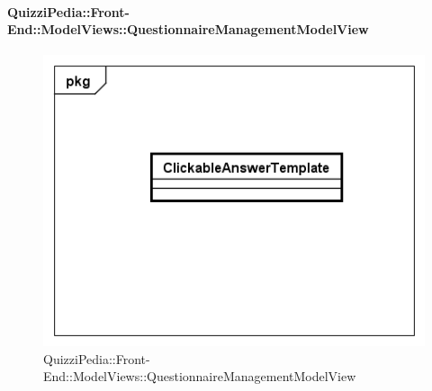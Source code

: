 	\paragraph{QuizziPedia::Front-End::ModelViews::QuestionnaireManagementModelView}
	
	\label{QuizziPedia::Front-End::ModelViews::QuestionnaireManagementModelView}
	
	\begin{figure}[ht]
		\centering
		\includegraphics[scale=0.5,keepaspectratio]{UML/Classi/Front-End/QuizziPedia_Front-end_Templates_ClickableAnswerTemplate.png}
		\caption{QuizziPedia::Front-End::ModelViews::QuestionnaireManagementModelView}
	\end{figure} \FloatBarrier
	
